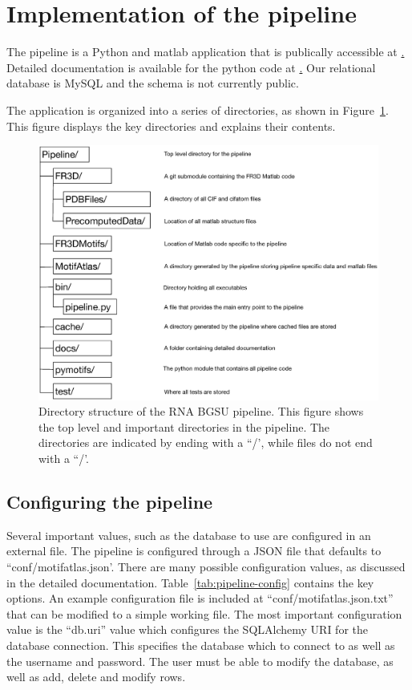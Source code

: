 \section{Implementation of the pipeline}

The pipeline is a Python and matlab application that is publically accessible at
\href{https://github.com/BGSU-RNA/RNA-3D-Hub-core}. Detailed documentation is
available for the python code at \href{http://rna-3d-hub-core.readthedocs.io/}.
Our relational database is MySQL and the schema is not currently public.

The application is organized into a series of directories, as shown in
Figure~\ref{fig:pipeline-organization}. This figure displays the key directories
and explains their contents.

\begin{figure}
  \includegraphics[width=\linewidth]{chapter-2/figs/directories}
\caption{Directory structure of the RNA BGSU pipeline. This figure shows the top
level and important directories in the pipeline. The directories are indicated
by ending with a ``/', while files do not end with a ``/'.}
\label{fig:pipeline-organization}
\end{figure}

\subsection{Configuring the pipeline}

Several important values, such as the database to use are configured in an
external file. The pipeline is configured through a JSON file that defaults to
``conf/motifatlas.json'. There are many possible configuration values, as
discussed in the detailed documentation. Table~\ref{tab:pipeline-config}
contains the key options. An example configuration file is included at
``conf/motifatlas.json.txt'' that can be modified to a simple working file. The
most important configuration value is the ``db.uri'' value which configures the
SQLAlchemy URI for the database connection. This specifies the database which to
connect to as well as the username and password. The user must be able to modify
the database, as well as add, delete and modify rows.

